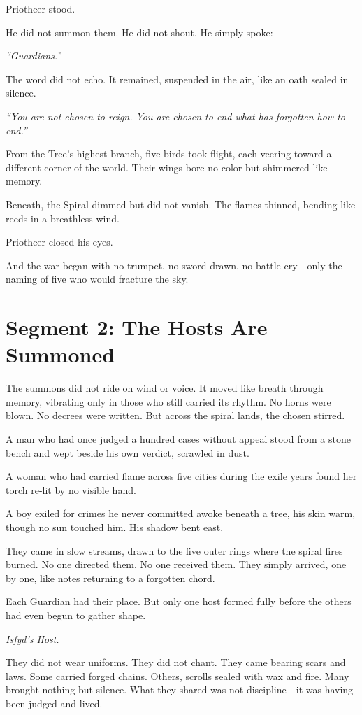 \documentclass[9pt]{article}
\begin{document}
Priotheer stood.

He did not summon them. He did not shout. He simply spoke:

\emph{``Guardians.''}

The word did not echo. It remained, suspended in the air, like an oath sealed in silence.

\emph{``You are not chosen to reign. You are chosen to end what has forgotten how to end.''}

From the Tree’s highest branch, five birds took flight, each veering toward a different corner of the world. Their wings bore no color but shimmered like memory.

Beneath, the Spiral dimmed but did not vanish. The flames thinned, bending like reeds in a breathless wind.

Priotheer closed his eyes.

And the war began with no trumpet, no sword drawn, no battle cry—only the naming of five who would fracture the sky.


\newpage

\section*{Segment 2: The Hosts Are Summoned}

The summons did not ride on wind or voice. It moved like breath through memory, vibrating only in those who still carried its rhythm. No horns were blown. No decrees were written. But across the spiral lands, the chosen stirred.

A man who had once judged a hundred cases without appeal stood from a stone bench and wept beside his own verdict, scrawled in dust.

A woman who had carried flame across five cities during the exile years found her torch re-lit by no visible hand.

A boy exiled for crimes he never committed awoke beneath a tree, his skin warm, though no sun touched him. His shadow bent east.

They came in slow streams, drawn to the five outer rings where the spiral fires burned. No one directed them. No one received them. They simply arrived, one by one, like notes returning to a forgotten chord.

Each Guardian had their place. But only one host formed fully before the others had even begun to gather shape.

\textit{Isfyd’s Host.}

They did not wear uniforms. They did not chant. They came bearing scars and laws. Some carried forged chains. Others, scrolls sealed with wax and fire. Many brought nothing but silence. What they shared was not discipline—it was having been judged and lived.
\end{document}
